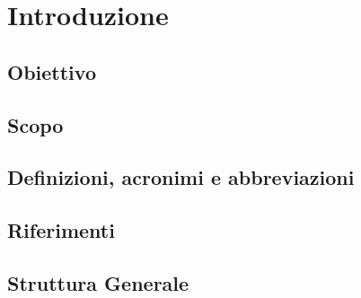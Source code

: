 \chapter{Introduzione}
\section{Obiettivo}
\section{Scopo}
\section{Definizioni, acronimi e abbreviazioni}
\section{Riferimenti}
\section{Struttura Generale}
